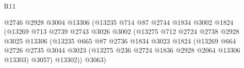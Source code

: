 \begin{lexlean}{R11}
\begin{coremodule}
                                          @2746
                                          @2928
                                          @3004
                                          @13306
                                          (@13235
                                            @714
                                            @87
                                            @2744
                                            @1834
                                            @3002
                                            @1824
                                            (@13269
                                              @713
                                              @2739
                                              @2743
                                              @3026
                                              @3002
                                              (@13275
                                                @712
                                                @2724
                                                @2738
                                                @2928
                                                @3025
                                                @13306
                                                (@13235
                                                  @665
                                                  @87
                                                  @2736
                                                  @1834
                                                  @3023
                                                  @1824
                                                  (@13269
                                                    @664
                                                    @2726
                                                    @2735
                                                    @3044
                                                    @3023
                                                    (@13275
                                                      @236
                                                      @2724
                                                      @1836
                                                      @2928
                                                      @2064
                                                      @13306
                                                      @13303)
                                                    @3057)
                                                  @13302))
                                              @3063)

\end{coremodule}
\end{lexlean}
